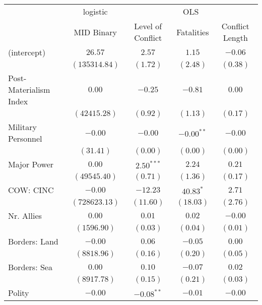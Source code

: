 
\begin{table}
\begin{center}
\begin{tabular}{l c c c c}
\toprule
 & \multicolumn{1}{c}{logistic} & \multicolumn{3}{c}{OLS} \\
\cmidrule(lr){2-2} \cmidrule(lr){3-5}
 & MID Binary & Level of Conflict & Fatalities & Conflict Length \\
\midrule
(intercept)                & $26.57$       & $2.57$       & $1.15$       & $-0.06$  \\
                           & $(135314.84)$ & $(1.72)$     & $(2.48)$     & $(0.38)$ \\
Post-Materialism Index     & $0.00$        & $-0.25$      & $-0.81$      & $0.00$   \\
                           & $(42415.28)$  & $(0.92)$     & $(1.13)$     & $(0.17)$ \\
Military Personnel         & $-0.00$       & $-0.00$      & $-0.00^{**}$ & $-0.00$  \\
                           & $(31.41)$     & $(0.00)$     & $(0.00)$     & $(0.00)$ \\
Major Power                & $0.00$        & $2.50^{***}$ & $2.24$       & $0.21$   \\
                           & $(49545.40)$  & $(0.71)$     & $(1.36)$     & $(0.17)$ \\
COW: CINC                  & $-0.00$       & $-12.23$     & $40.83^{*}$  & $2.71$   \\
                           & $(728623.13)$ & $(11.60)$    & $(18.03)$    & $(2.76)$ \\
Nr. Allies                 & $0.00$        & $0.01$       & $0.02$       & $-0.00$  \\
                           & $(1596.90)$   & $(0.03)$     & $(0.04)$     & $(0.01)$ \\
Borders: Land              & $-0.00$       & $0.06$       & $-0.05$      & $0.00$   \\
                           & $(8818.96)$   & $(0.16)$     & $(0.20)$     & $(0.05)$ \\
Borders: Sea               & $0.00$        & $0.10$       & $-0.07$      & $0.02$   \\
                           & $(8917.78)$   & $(0.15)$     & $(0.21)$     & $(0.03)$ \\
Polity                     & $-0.00$       & $-0.08^{**}$ & $-0.01$      & $-0.00$  \\

\end{tabular}
\end{center}
\end{table}
